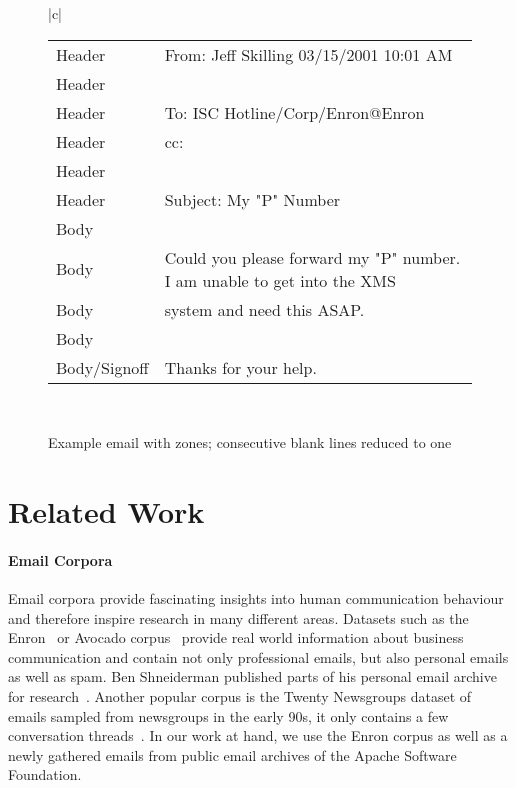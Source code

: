 \documentclass{llncs}
\begin{document}
\begin{figure}
\begin{tabular}{|c|}
{\begin{tabular*}{\textwidth}{l|l}
		Header         & From:  Jeff Skilling                           03/15/2001 10:01 AM \\
		Header         & \\
		Header         & To: ISC Hotline/Corp/Enron@Enron\\
		Header         & cc:\\
		Header         & \\
		Header         & Subject: My "P" Number\\\hline
		Body           & \\
		Body           & Could you please forward my "P" number.  I am unable to get into the XMS \\
		Body           & system and need this ASAP.\\
		Body           & \\
		Body/Signoff   & Thanks for your help.\\
	\end{tabular*}
}
	\\ 
	\hline 
\end{tabular} 
\caption{Example email with zones; consecutive blank lines reduced to one}
\label{fig:examplemail}
\end{figure}





\section{Related Work}
\paragraph{Email Corpora}
Email corpora provide fascinating insights into human communication behaviour and therefore inspire research in many different areas.
Datasets such as the Enron~\cite{enron} or Avocado corpus~\cite{avocado} provide real world information about business communication and contain not only professional emails, but also personal emails as well as spam.
Ben Shneiderman published parts of his personal email archive for research~\cite{shneiderman}.
Another popular corpus is the Twenty Newsgroups dataset of emails sampled from newsgroups in the early 90s, it only contains a few conversation threads~\cite{20news}.
In our work at hand, we use the Enron corpus as well as a newly gathered emails from public email archives of the Apache Software Foundation.
\end{document}
